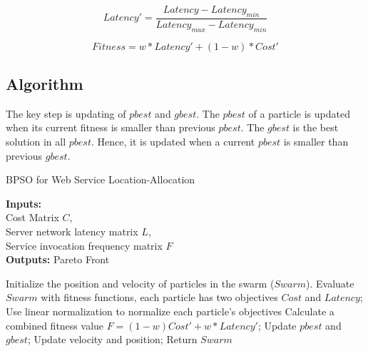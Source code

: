  \begin{equation}
 	\label{eq:latency_prime}
 	Latency' = \frac{Latency - Latency_{min}}{Latency_{max} - Latency_{min}}
 \end{equation}

\begin{equation}
\label{eq:Fitness}
	Fitness = w * Latency' + (1 - w) * Cost'
\end{equation}

\subsection{Algorithm}
The key step is updating of $pbest$ and $gbest$. The $pbest$ of a particle is updated when its current fitness is smaller than previous $pbest$.  
The $gbest$ is the best solution in all $pbest$. Hence, it is updated when a current $pbest$ is smaller than previous $gbest$. 

\begin{minipage}{1.0\linewidth}
 \begin{algorithm}[H]
 \footnotesize
	\caption{BPSO for Web Service Location-Allocation}
	\textbf{Inputs:} \\
		Cost Matrix $C$, \\
		Server network latency matrix $L$, \\
		Service invocation frequency matrix $F$ \\

	\textbf{Outputs:}
		Pareto Front

	\begin{algorithmic}[1]
	\State Initialize the position and velocity of particles in the swarm ($Swarm$).
	\Repeat
	  \State Evaluate $Swarm$ with fitness functions, each particle has two objectives $Cost$ and $Latency$;
	  \State Use linear normalization to normalize each particle's objectives
	  \State Calculate a combined fitness value $F = (1 - w) Cost' + w * Latency' $;
	  \State Update $pbest$ and $gbest$;
	  \State Update velocity and position;
	\State Return $Swarm$
	\end{algorithmic}
	\label{alg:BPSO}
\end{algorithm}
\end{minipage}



 
